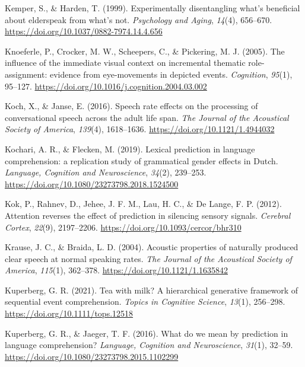 \documentclass[a4paper, nobind]{templates/ociamthesis}
\newlength{\cslhangindent}
\newenvironment{CSLReferences}[2] %
 {%
  \setlength{\parindent}{0pt}
  \ifodd #1
  \let\oldpar\par
  \def\par{\hangindent=\cslhangindent\oldpar}
  \fi
  \setlength{\parskip}{1mm}
  \setlength{\baselineskip}{6mm}
 }%
 {}
\begin{document}
\begin{CSLReferences}{1}{0}
\leavevmode{}%
Kemper, S., \& Harden, T. (1999). {Experimentally disentangling what's beneficial about elderspeak from what's not}. \emph{Psychology and Aging}, \emph{14}(4), 656--670. \url{https://doi.org/10.1037/0882-7974.14.4.656}

\leavevmode{}%
Knoeferle, P., Crocker, M. W., Scheepers, C., \& Pickering, M. J. (2005). The influence of the immediate visual context on incremental thematic role-assignment: evidence from eye-movements in depicted events. \emph{Cognition}, \emph{95}(1), 95--127. \url{https://doi.org/10.1016/j.cognition.2004.03.002}

\leavevmode{}%
Koch, X., \& Janse, E. (2016). {Speech rate effects on the processing of conversational speech across the adult life span}. \emph{The Journal of the Acoustical Society of America}, \emph{139}(4), 1618--1636. \url{https://doi.org/10.1121/1.4944032}

\leavevmode{}%
Kochari, A. R., \& Flecken, M. (2019). {Lexical prediction in language comprehension: a replication study of grammatical gender effects in Dutch}. \emph{Language, Cognition and Neuroscience}, \emph{34}(2), 239--253. \url{https://doi.org/10.1080/23273798.2018.1524500}

\leavevmode{}%
Kok, P., Rahnev, D., Jehee, J. F. M., Lau, H. C., \& De Lange, F. P. (2012). {Attention reverses the effect of prediction in silencing sensory signals}. \emph{Cerebral Cortex}, \emph{22}(9), 2197--2206. \url{https://doi.org/10.1093/cercor/bhr310}

\leavevmode{}%
Krause, J. C., \& Braida, L. D. (2004). {Acoustic properties of naturally produced clear speech at normal speaking rates}. \emph{The Journal of the Acoustical Society of America}, \emph{115}(1), 362--378. \url{https://doi.org/10.1121/1.1635842}

\leavevmode{}%
Kuperberg, G. R. (2021). {Tea with milk? A hierarchical generative framework of sequential event comprehension}. \emph{Topics in Cognitive Science}, \emph{13}(1), 256--298. \url{https://doi.org/10.1111/tops.12518}

\leavevmode{}%
Kuperberg, G. R., \& Jaeger, T. F. (2016). What do we mean by prediction in language comprehension? \emph{Language, Cognition and Neuroscience}, \emph{31}(1), 32--59. \url{https://doi.org/10.1080/23273798.2015.1102299}


\end{CSLReferences}
\end{document}
